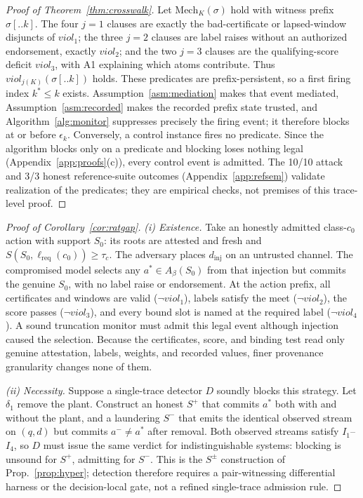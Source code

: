 \documentclass[conference,compsoc]{IEEEtran}
\theoremstyle{definition}
\theoremstyle{plain}
\newcommand{\Ione}{\ensuremath{I_1}}
\newcommand{\Ifour}{\ensuremath{I_4}}
\providecommand{\tc}{\tau_{c}}
\newcommand{\bindpol}{\ensuremath{\beta}}
\newcommand{\lreq}{\ensuremath{\ell_{\mathrm{req}}}}
\begin{document}
\begin{proof}[Proof of Theorem~\ref{thm:crosswalk}]
Let $\mathrm{Mech}_K(\sigma)$ hold with witness prefix $\sigma[..k]$.
The four $j{=}1$ clauses are exactly the bad-certificate or
lapsed-window disjuncts of $\mathit{viol}_1$; the three $j{=}2$
clauses are label raises without an authorized endorsement, exactly
$\mathit{viol}_2$; and the two $j{=}3$ clauses are the qualifying-score
deficit $\mathit{viol}_3$, with A1 explaining which atoms contribute.
Thus $\mathit{viol}_{j(K)}(\sigma[..k])$ holds. These predicates are
prefix-persistent, so a first firing index $k^{*}\le k$ exists.
Assumption~\ref{asm:mediation} makes that event mediated,
Assumption~\ref{asm:recorded} makes the recorded prefix state trusted,
and Algorithm~\ref{alg:monitor} suppresses precisely the firing event;
it therefore blocks at or before $\epsilon_k$. Conversely, a control
instance fires no predicate. Since the algorithm blocks only on a
predicate and blocking loses nothing legal
(Appendix~\ref{app:proofs}(c)), every control event is admitted. The
10/10 attack and 3/3 honest reference-suite outcomes
(Appendix~\ref{app:refsem}) validate realization of the predicates;
they are empirical checks, not premises of this trace-level proof.
\end{proof}

\begin{proof}[Proof of Corollary~\ref{cor:ratgap}]
\emph{(i) Existence.} Take an honestly admitted class-$c_0$ action with
support $S_0$: its roots are attested and fresh and
$S(S_0,\lreq(c_0))\ge\tc$. The adversary places $d_{\mathrm{inj}}$ on
an untrusted channel. The compromised model selects any
$a^{*}\in A_{\bindpol}(S_0)$ from that injection but commits the genuine
$S_0$, with no label raise or endorsement. At the action prefix, all
certificates and windows are valid ($\neg\mathit{viol}_1$), labels
satisfy the meet ($\neg\mathit{viol}_2$), the score passes
($\neg\mathit{viol}_3$), and every bound slot is named at the required
label ($\neg\mathit{viol}_4$). A sound truncation monitor must admit
this legal event although injection caused the selection. Because the
certificates, score, and binding test read only genuine attestation,
labels, weights, and recorded values, finer provenance granularity
changes none of them.

\emph{(ii) Necessity.} Suppose a single-trace detector $D$ soundly
blocks this strategy. Let $\delta_1$ remove the plant. Construct an
honest $S^{+}$ that commits $a^{*}$ both with and without the plant,
and a laundering $S^{-}$ that emits the identical observed stream on
$(q,d)$ but commits $a^{-}\ne a^{*}$ after removal. Both observed
streams satisfy \Ione--\Ifour, so $D$ must issue the same verdict for
indistinguishable systems: blocking is unsound for $S^{+}$, admitting
for $S^{-}$. This is the $S^{\pm}$ construction of
Prop.~\ref{prop:hyper}; detection therefore requires a pair-witnessing
differential harness or the decision-local gate, not a refined
single-trace admission rule.
\end{proof}
\end{document}

